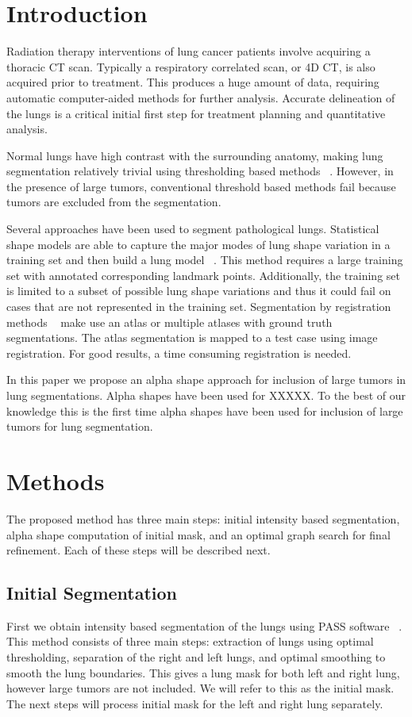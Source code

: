 \documentclass{llncs}
\begin{document}
\section{Introduction}
%
Radiation therapy interventions of lung cancer patients involve acquiring a thoracic CT scan. Typically a respiratory correlated scan, or 4D CT, is also acquired prior to treatment. This produces a huge amount of data, requiring automatic computer-aided methods for further analysis. Accurate delineation of the lungs is a critical initial first step for treatment planning and quantitative analysis.

Normal lungs have high contrast with the surrounding anatomy, making lung segmentation relatively trivial using thresholding based methods ~\cite{guo2008,hu2001}. However, in the presence of large tumors, conventional threshold based methods fail because tumors are excluded from the segmentation. 

Several approaches have been used to segment pathological lungs. Statistical shape models are able to capture the major modes of lung shape variation in a training set and then build a lung model ~\cite{sun2012,sofka2011}. This method requires a large training set with annotated corresponding landmark points. Additionally, the training set is limited to a subset of possible lung shape variations and thus it could fail on cases that are not represented in the training set. Segmentation by registration methods ~\cite{sluimer2005,vanrikxoort2009} make use an atlas or multiple atlases with ground truth segmentations. The atlas segmentation is mapped to a test case using image registration. For good results, a time consuming registration is needed.

In this paper we propose an alpha shape approach for inclusion of large tumors in lung segmentations. Alpha shapes have been used for XXXXX. To the best of our knowledge this is the first time alpha shapes have been used for inclusion of large tumors for lung segmentation. 


%
\section{Methods}
%
The proposed method has three main steps: initial intensity based segmentation, alpha shape computation of initial mask, and an optimal graph search for final refinement. Each of these steps will be described next.
%
\subsection{Initial Segmentation}
%
First we obtain intensity based segmentation of the lungs using PASS software ~\cite{guo2008}. This method consists of three main steps: extraction of lungs using optimal thresholding, separation of the right and left lungs, and optimal smoothing to smooth the lung boundaries. This gives a lung mask for both left and right lung, however large tumors are not included. We will refer to this as the initial mask. The next steps will process initial mask for the left and right lung separately. 
%
\end{document}
